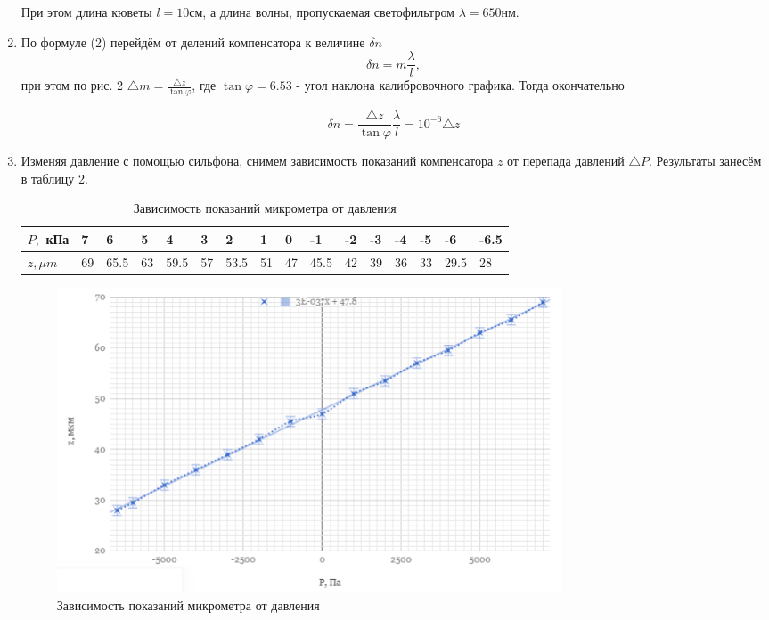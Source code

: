 \documentclass[a4paper]{article}
\begin{document}
\begin{enumerate}
При этом длина кюветы $l = 10 $см, а длина волны, пропускаемая светофильтром $\lambda = 650 $нм.

\item По формуле (2) перейдём от делений компенсатора к величине $\delta n$
\begin{equation}
    \delta n = m\frac{\lambda}{l},
\end{equation}
при этом по рис. 2 $\triangle m = \frac{\triangle z}{\tan \varphi}$, где $\tan \varphi = 6.53$ - угол наклона калибровочного графика. Тогда окончательно

\begin{equation}
    \delta n = \frac{\triangle z}{\tan \varphi} \frac{\lambda}{l} = 10^{-6} \triangle z
\end{equation}

\item Изменяя давление с помощью сильфона, снимем зависимость показаний компенсатора $z$ от перепада давлений $\triangle P$. Результаты занесём в таблицу 2.

    \begin{table}[h]
    \centering
    \begin{center}
    \caption{Зависимость показаний микрометра от давления}
    \end{center}
    \vspace{0.1cm}
    \label{tab:my_label}
    \begin{tabular}{ |p{1.5cm}||p{0.5cm}|p{0.5cm}|p{0.5cm}|p{0.5cm}|p{0.5cm}|p{0.5cm}|p{0.5cm}|p{0.5cm}| p{0.5cm}|p{0.5cm}|p{0.5cm}|p{0.5cm}|p{0.5cm}|p{0.5cm}|p{0.6cm}|}
 \hline
$P, $ кПа & 7 & 6 & 5 & 4 & 3 & 2 & 1 & 0 & -1 & -2 & -3 & -4 & -5 & -6 & -6.5\\
 \hline
 $z, \mu m$ & 69 & 65.5 & 63 & 59.5 & 57 & 53.5 & 51 & 47 & 45.5 & 42 & 39 & 36 & 33 & 29.5 & 28\\

 \hline
 
\end{tabular}
\end{table}

    \begin{figure}[h]
    \centering
    \includegraphics[width=15cm]{graph1.PNG}
    \caption{Зависимость показаний микрометра от давления}
    \label{fig:vac}
\end{figure}


\end{enumerate}
\end{document}
